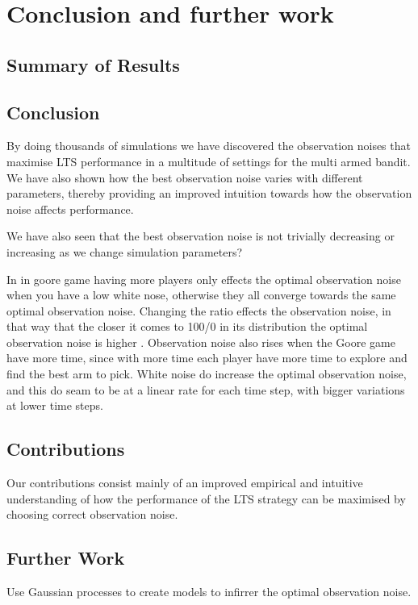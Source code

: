\chapter{Conclusion and further work}
\label{ch:conclusion}

\section{Summary of Results}

\section{Conclusion}

By doing thousands of simulations we have discovered the observation noises that maximise LTS performance in a multitude of settings for the multi armed bandit.
We have also shown how the best observation noise varies with different parameters, thereby providing an improved intuition towards how the observation noise affects performance.

We have also seen that the best observation noise is not trivially decreasing or increasing as we change simulation parameters?

In in goore game having more players only effects the optimal observation noise when you have a low white nose,
otherwise they all converge towards the same optimal observation noise. Changing the ratio effects the observation
noise, in that way that the closer it comes to 100/0 in its distribution the optimal observation noise is higher .
Observation noise also rises when the Goore game have more time, since with more time each player have more time to explore
and find the best arm to pick. White noise do increase the optimal observation noise, and this do seam to be at a
linear rate for each time step, with bigger variations at lower time steps.

\section{Contributions}
Our contributions consist mainly of an improved empirical and intuitive understanding of how the performance of the LTS strategy can be maximised by choosing correct observation noise.


\section{Further Work}
Use Gaussian processes to create models to infirrer the optimal observation noise.


